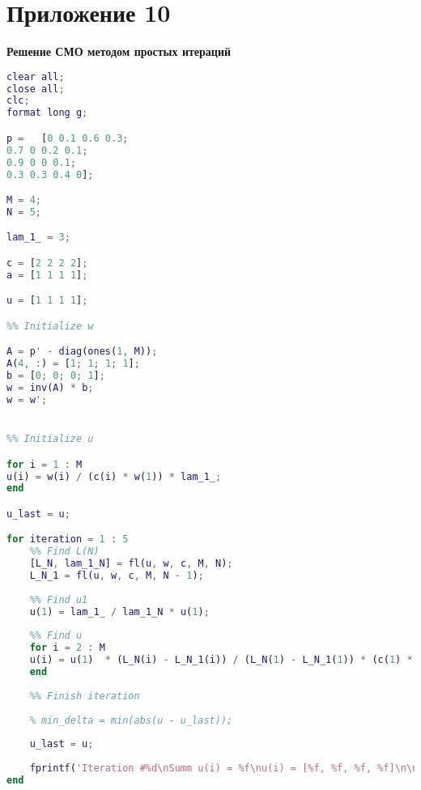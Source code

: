 \section*{Приложение 10} \label{p3:10}
\textbf{Решение СМО методом простых итераций}
\begin{lstlisting}[language={matlab}, caption={Решение СМО методом простых итераций}, label={lst:0}, basicstyle={\footnotesize\ttfamily}, breaklines={true}]
clear all;
close all; 
clc;
format long g;

p =   [0 0.1 0.6 0.3;
0.7 0 0.2 0.1;
0.9 0 0 0.1;
0.3 0.3 0.4 0];

M = 4;
N = 5;

lam_1_ = 3;

c = [2 2 2 2];
a = [1 1 1 1];

u = [1 1 1 1];

%% Initialize w

A = p' - diag(ones(1, M));
A(4, :) = [1; 1; 1; 1];
b = [0; 0; 0; 1];
w = inv(A) * b;
w = w';


%% Initialize u

for i = 1 : M
u(i) = w(i) / (c(i) * w(1)) * lam_1_;
end

u_last = u;

for iteration = 1 : 5
	%% Find L(N)
	[L_N, lam_1_N] = fl(u, w, c, M, N);
	L_N_1 = fl(u, w, c, M, N - 1);
	
	%% Find u1
	u(1) = lam_1_ / lam_1_N * u(1);
	
	%% Find u
	for i = 2 : M
	u(i) = u(1)  * (L_N(i) - L_N_1(i)) / (L_N(1) - L_N_1(1)) * (c(1) * a(1)) / (c(i) * a(i));
	end
	
	%% Finish iteration
	
	% min_delta = min(abs(u - u_last));
	
	u_last = u;
	
	fprintf('Iteration #%d\nSumm u(i) = %f\nu(i) = [%f, %f, %f, %f]\n\n', iteration, sum(u), u(1), u(2), u(3), u(4));
end

\end{lstlisting}

